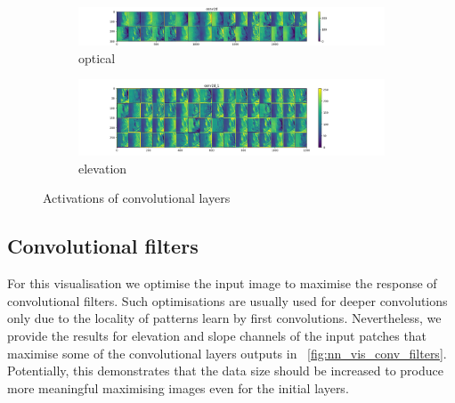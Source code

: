 \documentclass[11pt,a4paper]{article}
\begin{document}
\begin{figure}[t]
    \centering
    \begin{subfigure}[b]{\textwidth}
        \includegraphics[width=\textwidth]{graphics/nn_visualisation/intermediate_activations_conv2d.png}
        \caption{optical}
    \end{subfigure}

    \begin{subfigure}[b]{\textwidth}
        \includegraphics[width=\textwidth]{graphics/nn_visualisation/intermediate_activations_conv2d_1.png}
        \caption{elevation}
    \end{subfigure}

    \caption{Activations of convolutional layers}
    \label{fig:nn_vis_input_act}
\end{figure}

\subsection{Convolutional filters}
For this visualisation we optimise the input image to maximise the response of convolutional filters. Such
optimisations are usually used for deeper convolutions only due to the locality of patterns learn by first convolutions.
Nevertheless, we provide the results for elevation and slope channels of the input patches that maximise some of the
convolutional layers outputs in \figurename~\ref{fig:nn_vis_conv_filters}. Potentially, this demonstrates that the data
size should be increased to produce more meaningful maximising images even for the initial layers.
\end{document}
